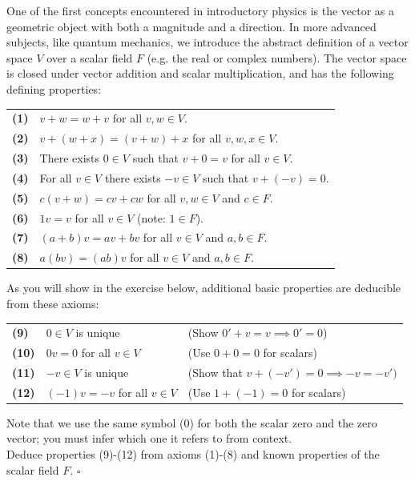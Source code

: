 \documentclass[12pt]{article}
\begin{document}
One of the first concepts encountered in introductory physics is the
vector as a geometric object with both a magnitude and a direction.
In more advanced subjects, like quantum mechanics, we introduce the
abstract definition of a vector space $V$ over a scalar field $F$
(e.g. the real or complex numbers).  The vector space is closed under
vector addition and scalar multiplication, and has the following
defining properties:
\begin{center}
\begin{tabular}{ll}
{\bf (1)} & $v+w = w+v$ for all $v,w \in V$.\\
{\bf (2)} & $v+(w+x) = (v+w)+x$ for all $v,w,x \in V$. \\
{\bf (3)} & There exists $0 \in V$ such that $v+0=v$ for all $v \in V$.\\
{\bf (4)} & For all $v \in V$ there exists $-v \in V$ such that $v + (-v) = 0$.\\
{\bf (5)} & $c(v+w) = cv + cw$ for all $v,w \in V$ and $c \in F$.\\
{\bf (6)} & $1v = v$ for all $v \in V$ (note: $1 \in F$).\\
{\bf (7)} & $(a+b)v = a v + b v$ for all $v \in V$ and $a,b \in F$.\\
{\bf (8)} & $a(b v) = (a b ) v$ for all $v \in V$ and $a,b \in F$.\\
\end{tabular}
\end{center}
As you will show in the exercise below, additional basic properties are deducible from these axioms:
\begin{center}
  \begin{tabular}{lll}
{\bf (9)}  & $0 \in V$ is unique & (Show $0'+v = v \implies 0' = 0$) \\
{\bf (10)} & $0 v = 0$ for all $v \in V$ & (Use $0+0=0$ for scalars) \\
{\bf (11)} & $-v \in V$ is unique & (Show that $v+(-v') = 0 \implies -v = -v')$\\
{\bf (12)} & $(-1)v = -v$ for all $v \in V$ & (Use $1+(-1)=0$ for scalars)\\
\end{tabular}
\end{center}
Note that we use the same symbol ($0$) for both the scalar zero and
the zero vector; you must infer which one it refers to from context.\\

\exercise Deduce properties (9)-(12) from axioms (1)-(8) and known
properties of the scalar field $F$.  $\square$ \\[3pt]
\end{document}
